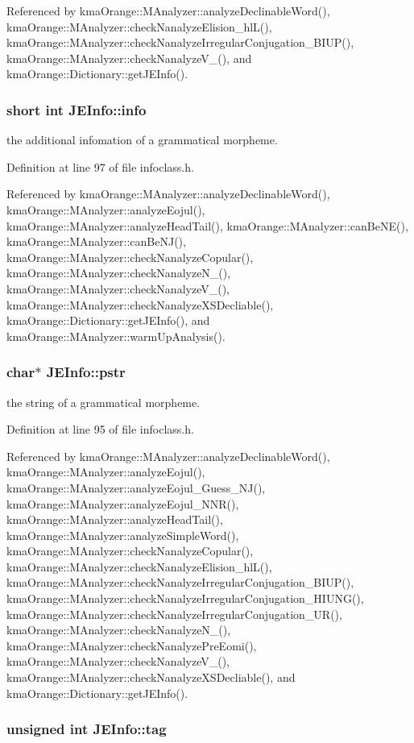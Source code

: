 Referenced by kmaOrange::MAnalyzer::analyzeDeclinableWord(), kmaOrange::MAnalyzer::checkNanalyzeElision\_\-hlL(), kmaOrange::MAnalyzer::checkNanalyzeIrregularConjugation\_\-BIUP(), kmaOrange::MAnalyzer::checkNanalyzeV\_\-(), and kmaOrange::Dictionary::getJEInfo().\hypertarget{classJEInfo_ce5273ed935ff3a80e874c67601c27d4}{
\subsubsection[{info}]{\setlength{\rightskip}{0pt plus 5cm}short int {\bf JEInfo::info}}}
\label{classJEInfo_ce5273ed935ff3a80e874c67601c27d4}


the additional infomation of a grammatical morpheme. 



Definition at line 97 of file infoclass.h.

Referenced by kmaOrange::MAnalyzer::analyzeDeclinableWord(), kmaOrange::MAnalyzer::analyzeEojul(), kmaOrange::MAnalyzer::analyzeHeadTail(), kmaOrange::MAnalyzer::canBeNE(), kmaOrange::MAnalyzer::canBeNJ(), kmaOrange::MAnalyzer::checkNanalyzeCopular(), kmaOrange::MAnalyzer::checkNanalyzeN\_\-(), kmaOrange::MAnalyzer::checkNanalyzeV\_\-(), kmaOrange::MAnalyzer::checkNanalyzeXSDecliable(), kmaOrange::Dictionary::getJEInfo(), and kmaOrange::MAnalyzer::warmUpAnalysis().\hypertarget{classJEInfo_26f7a8dc6274d7599b112a8d8890c768}{
\subsubsection[{pstr}]{\setlength{\rightskip}{0pt plus 5cm}char$\ast$ {\bf JEInfo::pstr}}}
\label{classJEInfo_26f7a8dc6274d7599b112a8d8890c768}


the string of a grammatical morpheme. 



Definition at line 95 of file infoclass.h.

Referenced by kmaOrange::MAnalyzer::analyzeDeclinableWord(), kmaOrange::MAnalyzer::analyzeEojul(), kmaOrange::MAnalyzer::analyzeEojul\_\-Guess\_\-NJ(), kmaOrange::MAnalyzer::analyzeEojul\_\-NNR(), kmaOrange::MAnalyzer::analyzeHeadTail(), kmaOrange::MAnalyzer::analyzeSimpleWord(), kmaOrange::MAnalyzer::checkNanalyzeCopular(), kmaOrange::MAnalyzer::checkNanalyzeElision\_\-hlL(), kmaOrange::MAnalyzer::checkNanalyzeIrregularConjugation\_\-BIUP(), kmaOrange::MAnalyzer::checkNanalyzeIrregularConjugation\_\-HIUNG(), kmaOrange::MAnalyzer::checkNanalyzeIrregularConjugation\_\-UR(), kmaOrange::MAnalyzer::checkNanalyzeN\_\-(), kmaOrange::MAnalyzer::checkNanalyzePreEomi(), kmaOrange::MAnalyzer::checkNanalyzeV\_\-(), kmaOrange::MAnalyzer::checkNanalyzeXSDecliable(), and kmaOrange::Dictionary::getJEInfo().\hypertarget{classJEInfo_66e1bd182ba8e9a314ab2db35365188b}{
\subsubsection[{tag}]{\setlength{\rightskip}{0pt plus 5cm}unsigned int {\bf JEInfo::tag}}}
\label{classJEInfo_66e1bd182ba8e9a314ab2db35365188b}


